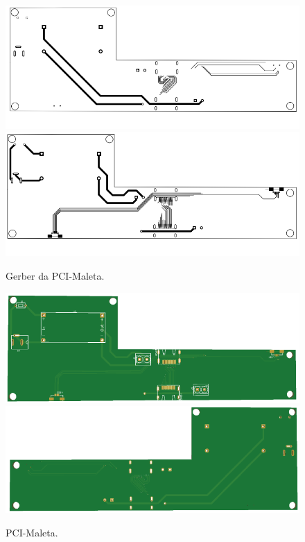 \begin{figure}[H]
  \centering
  \includegraphics[scale=0.35]{Figuras/pci fabric/gerber maleta bottom layer.png}
    \includegraphics[scale=0.35]{Figuras/pci fabric/gerber maleta toplayer.png}
  \caption{Gerber da PCI-Maleta.}
  \label{fig:Gerber da PCI-Maleta}
\end{figure}


\begin{figure}[H]
  \centering
  \includegraphics[scale=0.4]{Figuras/pci fabric/maleta_top.png}
    \includegraphics[scale=0.4]{Figuras/pci fabric/maleta_bottom.png}
  \caption{PCI-Maleta.}
  \label{fig: PCI-Maleta}
\end{figure}

